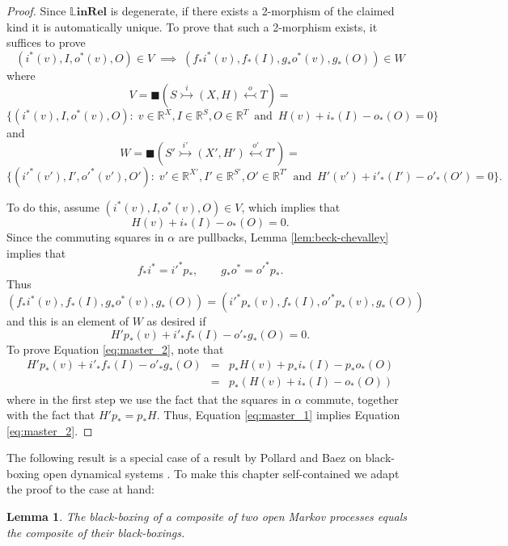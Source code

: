 \documentclass[oneside,final]{ucr}
\newtheorem{lemma}[theorem]{Lemma}
\theoremstyle{definition}
\newcommand{\R}{\mathbb{R}}
\newcommand{\LLinRel}{\mathbb{L}\mathbf{inRel}}
\begin{document}
{\begin{proof}  
Since $\LLinRel$ is degenerate, if there exists a 2-morphism of the claimed kind it is
automatically unique.  To prove that such a 2-morphism exists, it suffices to prove
\[    (i^*(v),I,o^*(v),O) \in V \; \implies \;  (f_* i^*(v),f_*(I), g_* o^*(v),g_*(O)) \in W \]
where
\[  V = \blacksquare(S \stackrel{i}{\rightarrowtail} (X,H) \stackrel{o}{\leftarrowtail} T) = \]
\[  \{ (i^*(v),I,o^*(v),O) : \; v \in \R^X,  I \in \R^S, O \in \R^T \, 
\textrm{ and } \, H(v) + i_*(I) - o_*(O) = 0\} \]
and
\[ W = \blacksquare(S' \stackrel{i'}{\rightarrowtail} (X',H') \stackrel{o'}{\leftarrowtail} T') = \]
\[ \{ (i'^*(v'),I',o'^*(v'),O') : \; v' \in \R^{X'},  I' \in \R^{S'}, O' \in \R^{T'} \, 
\textrm{ and } \, H'(v') + i'_*(I') - o'_*(O') = 0\} .\]

To do this, assume $  (i^*(v),I,o^*(v),O) \in V$, which implies that
\begin{equation}
  H(v) + i_*(I) - o_*(O) = 0 .    \label{eq:master_1}
\end{equation}
Since the commuting squares in $\alpha$ are pullbacks,  Lemma \ref{lem:beck-chevalley} implies that
\[
     f_* i^* = i'^* p_*    , \qquad
     g_* o^* = o'^* p_*  . 
\]
Thus
\[     (f_* i^*(v),f_*(I), g_* o^*(v),g_*(O)) = (i'^* p_*(v), f_*(I), o'^* p_*(v),g_*(O) )  \]
and this is an element of $W$ as desired if
\begin{equation}   
    H' p_*(v) + i'_* f_*(I) - o'_* g_*(O) = 0 .   \label{eq:master_2} 
\end{equation}
To prove Equation \eqref{eq:master_2}, note that
\[
\begin{array}{ccl}
   H' p_*(v) + i'_* f_*(I) - o'_* g_*(O) &=& p_*H (v) + p_* i_*(I) - p_* o_* (O)  \\ 
                                                          &=& p_*(H(v) + i_*(I) - o_*(O)) 
\end{array}
\]
where in the first step we use the fact that the squares in $\alpha$ commute, together with the fact that $H' p_* = p_* H$.   Thus, Equation \eqref{eq:master_1} implies Equation \eqref{eq:master_2}. 
\end{proof}

The following result is a special case of a result by Pollard and Baez on black-boxing open dynamical systems \cite{BP}.   To make this chapter self-contained we adapt the proof
to the case at hand:

\begin{lemma}
\label{lem:black-boxing_symmoncat}
The black-boxing of a composite of two open Markov processes equals the composite of
their black-boxings.
\end{lemma}

}
\end{document}
